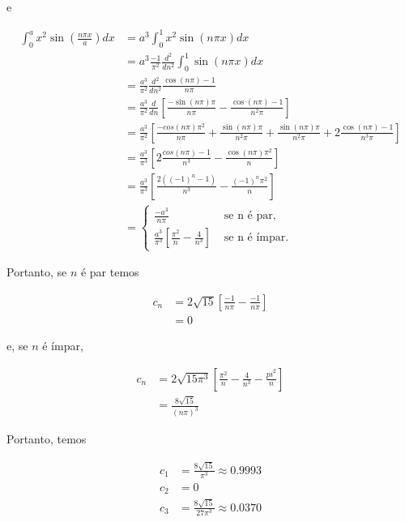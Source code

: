 \documentclass[a4paper, 12pt, notitlepage]{article}
\begin{document}
\begin{enumerate}
  e
  
  \begin{align*}
  \int_0^a x^2 \sin\left( \frac{n\pi x}{a} \right) dx &= a^3 \int_0^1 x^2 \sin(n\pi x) dx \\
  &= a^3 \frac{-1}{\pi^2} \frac{d^2}{dn^2} \int_0^1 \sin (n\pi x) dx \\
  &= \frac{a^3}{\pi^2} \frac{d^2}{dn^2} \frac{\cos (n\pi) - 1}{n \pi} \\
  &= \frac{a^3}{\pi^2} \frac{d}{dn} \left[\frac{-\sin(n\pi) \pi}{n \pi} - \frac{\cos(n\pi) - 1}{n^2 \pi} \right] \\
  &= \frac{a^3}{\pi^2} \left[ \frac{-cos(n\pi) \pi^2}{n \pi} + \frac{\sin(n\pi) \pi}{n^2\pi} + \frac{\sin(n\pi) \pi}{n^2 \pi} + 2\frac{\cos(n\pi) - 1}{n^3\pi} \right] \\
  &= \frac{a^3}{\pi^3} \left[ 2\frac{cos(n\pi) - 1}{n^3} - \frac{\cos(n\pi)\pi^2}{n} \right] \\
  &= \frac{a^3}{\pi^3} \left[ \frac{2((-1)^n - 1)}{n^3} - \frac{(-1)^n \pi^2}{n} \right] \\
  &= \begin{cases} 
      \frac{-a^3}{n\pi}&\text{ se n é par,}\\
      \frac{a^3}{\pi^3}\left[\frac{\pi^2}{n} - \frac{4}{n^3}\right]&\text{ se n é ímpar.} 
    \end{cases}
  \end{align*}
  
  Portanto, se $n$ é par temos
  
  \begin{align*}
    c_n &= 2\sqrt{15} \left[ \frac{-1}{n\pi} - \frac{-1}{n\pi} \right] \\
    &= 0
  \end{align*}
  
  e, se $n$ é ímpar,
  
  \begin{align*}
    c_n &= 2\sqrt{15\pi^3} \left[ \frac{\pi^2}{n} - \frac{4}{n^3} - \frac{pi^2}{n}\right] \\
    &= \frac{8\sqrt{15}}{(n\pi)^3}
  \end{align*}
  
  Portanto, temos
  
  \begin{align*}
  c_1 &= \frac{8\sqrt{15}}{\pi^3} \approx 0.9993 \\
  c_2 &= 0 \\
  c_3 &= \frac{8\sqrt{15}}{27\pi^3} \approx 0.0370
  \end{align*}
  

\end{enumerate}
\end{document}
